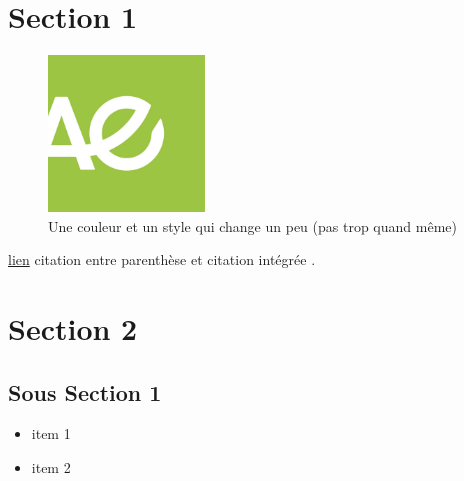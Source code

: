 \documentclass{config}
\begin{document}
\newpage 
{\hypersetup{linkcolor=LightCyan}\tableofcontents}
\newpage


\section{Section 1}
\begin{figure}
    \centering
    \vspace{-4mm}
    \includegraphics[width=0.37\textwidth]{figures/figure1.jpg}
    \vspace{-1mm}
    \captionsetup{width=0.37\textwidth}
    \caption{Une couleur et un style qui change un peu (pas trop quand même)}
    \label{fig:figure1}
    \vspace{-15mm}
\end{figure}
\lipsum[1][1] \href{https://makaho.sk8.inrae.fr/}{lien} \lipsum[1][2] citation entre parenthèse \citep{foote1856circumstances, doyle1992adventures} et citation intégrée \citet{template}.\par
\lipsum[1][3-5]


\section{Section 2}
\subsection{Sous Section 1}
\lipsum[2]

\begin{itemize}
\item item 1
\item item 2
\end{itemize}
\vspace{2mm}

\lipsum[3]
\end{document}
